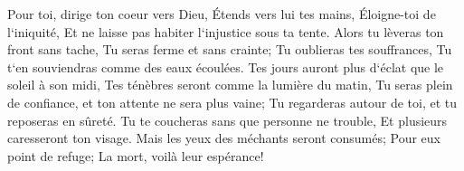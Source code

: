 \verse Pour toi, dirige ton coeur vers Dieu, Étends vers lui tes mains, 
\verse Éloigne-toi de l`iniquité, Et ne laisse pas habiter l`injustice sous ta tente. 
\verse Alors tu lèveras ton front sans tache, Tu seras ferme et sans crainte; 
\verse Tu oublieras tes souffrances, Tu t`en souviendras comme des eaux écoulées. 
\verse Tes jours auront plus d`éclat que le soleil à son midi, Tes ténèbres seront comme la lumière du matin, 
\verse Tu seras plein de confiance, et ton attente ne sera plus vaine; Tu regarderas autour de toi, et tu reposeras en sûreté. 
\verse Tu te coucheras sans que personne ne trouble, Et plusieurs caresseront ton visage. 
\verse Mais les yeux des méchants seront consumés; Pour eux point de refuge; La mort, voilà leur espérance! 

